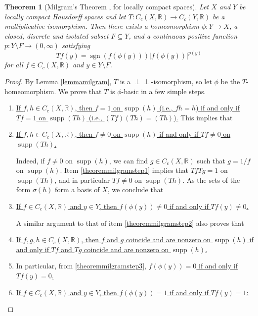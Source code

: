 \documentclass[letter,11pt]{amsart}
\theoremstyle{plain}		\newtheorem{theorem}[generalnumbering]{Theorem}
\theoremstyle{plain}		\newtheorem{corollary}[generalnumbering]{Corollary}
\theoremstyle{definition}		\newtheorem{definition}[generalnumbering]{Definition}
\theoremstyle{definition}		\newtheorem{example}[generalnumbering]{Example}
\theoremstyle{plain}		\newtheorem{proposition}[generalnumbering]{Proposition}
\theoremstyle{plain}		\newtheorem{lemma}[generalnumbering]{Lemma}
\theoremstyle{plain}    \newtheorem{plainstyle}[generalnumbering]{\namefordifferentenvironment}
\theoremstyle{plain}    \newtheorem*{plainstyle*}{\namefordifferentenvironment}
\theoremstyle{definition}    \newtheorem{definitionstyle}[generalnumbering]{\namefordifferentenvironment}
\theoremstyle{definition}    \newtheorem*{definitionstyle*}{\namefordifferentenvironment}
\newcommand{\perpp}{\perp\!\!\!\perp}
\DeclareMathOperator{\supp}{supp}
\begin{document}
\begin{theorem}[{Milgram's Theorem \cite[Theorem A]{MR0029476}, for locally compact spaces}]\label{theoremmilgram}
	Let $X$ and $Y$ be locally compact Hausdorff spaces and let $T\colon C_c(X,\mathbb{R})\to C_c(Y,\mathbb{R})$ be a multiplicative isomorphism. Then there exists a homeomorphism $\phi\colon Y\to X$, a closed, discrete and isolated subset $F\subseteq Y$, and a continuous positive function $p\colon Y\setminus F\to(0,\infty)$ satisfying
	\[Tf(y)=\operatorname{sgn}(f(\phi(y)))|f(\phi (y))|^{p(y)}\]
	for all $f\in C_c(X,\mathbb{R})$ and $y\in Y\setminus F$.
\end{theorem}
\begin{proof}
	By Lemma \ref{lemmamilgram}, $T$ is a $\perpp$-isomorphism, so let $\phi$ be the $T$-homeomorphism. We prove that $T$ is $\phi$-basic in a few simple steps.
	\begin{enumerate}[label=\arabic*.]
		\item\label{theoremmilgramstep1} \uline{If $f,h\in C_c(X,\mathbb{R})$, then $f=1$ on $\supp(h)$ (i.e., $fh=h$) if and only if $Tf=1$ on $\supp(Th)$ (i.e., $(Tf)(Th)=(Th)$).} This implies that
		
		\item\label{theoremmilgramstep2} \uline{If $f,h\in C_c(X,\mathbb{R})$, then $f\neq 0$ on $\supp(h)$ if and only if $Tf\neq 0$ on $\supp(Th)$.}
		
		Indeed, if $f\neq 0$ on $\supp(h)$, we can find $g\in C_c(X,\mathbb{R})$ such that $g=1/f$ on $\supp(h)$. Item \ref{theoremmilgramstep1} implies that $TfTg=1$ on $\supp(Th)$, and in particular $Tf\neq 0$ on $\supp(Th)$. As the sets of the form $\sigma(h)$ form a basis of $X$, we conclude that
		
		\item\label{theoremmilgramstep3} \uline{If $f\in C_c(X,\mathbb{R})$ and $y\in Y$, then $f(\phi(y))\neq 0$ if and only if $Tf(y)\neq 0$.}
		
		A similar argument to that of item \ref{theoremmilgramstep2} also proves that
		
		\item\label{theoremmilgramstep4} \uline{If $f,g,h\in C_c(X,\mathbb{R})$, then $f$ and $g$ coincide and are nonzero on $\supp(h)$ if and only if $Tf$ and $Tg$ coincide and are nonzero on $\supp(h)$.}
		
		\item\label{theoremmilgramstep5} In particular, from \ref{theoremmilgramstep3}, \uline{$f(\phi(y))=0$ if and only if $Tf(y)=0$.}
		\item\label{theoremmilgramstep6} \uline{If $f\in C_c(X,\mathbb{R})$ and $y\in Y$, then $f(\phi(y))=1$ if and only if $Tf(y)=1$:}
		

\end{enumerate}
\end{proof}
\end{document}
